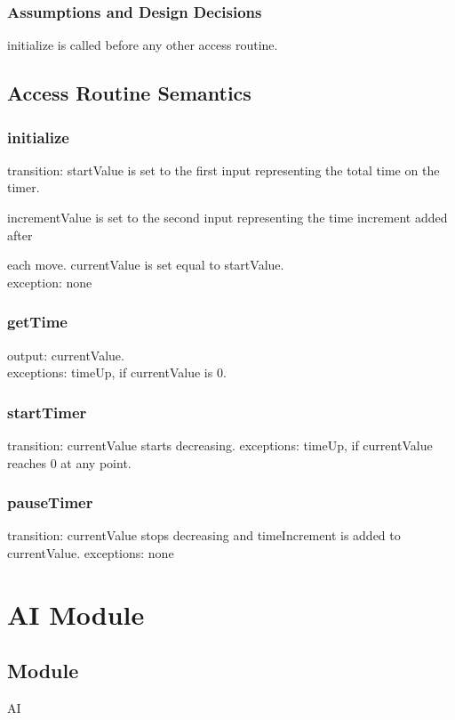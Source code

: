 \documentclass{article}
\begin{document}
        \subsubsection*{Assumptions and Design Decisions}
            initialize is called before any other access routine.
            
    \subsection*{Access Routine Semantics}
        \subsubsection*{initialize} 
            transition: startValue is set to the first input representing the total time on the timer. 
            
            incrementValue is set to the second input representing the time increment added after 
            
            each move. currentValue is set equal to startValue.\\
            exception: none
            
        \subsubsection*{getTime}
            output: currentValue. \\
            exceptions: timeUp, if currentValue is 0.
        
        \subsubsection*{startTimer}
            transition: currentValue starts decreasing.
            exceptions: timeUp, if currentValue reaches 0 at any point.
        
        \subsubsection*{pauseTimer}
            transition: currentValue stops decreasing and timeIncrement is added to currentValue.
            exceptions: none            

\newpage
\section*{AI Module}
    \subsection*{Module}
        AI
    
\end{document}

